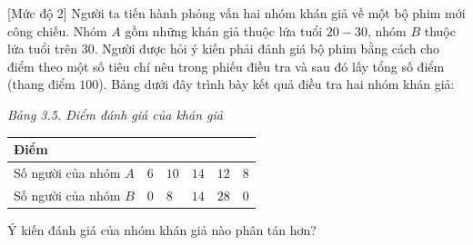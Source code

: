 \begin{bt}%
[Mức độ 2]
Người ta tiến hành phỏng vấn hai nhóm khán giả về một bộ phim mới công chiếu. Nhóm $A$ gồm những khán giả thuộc lứa tuổi $20-30$, nhóm $B$ thuộc lứa tuổi trên $30$. Người được hỏi ý kiến phải đánh giá bộ phim bằng cách cho điểm theo một số tiêu chí nêu trong phiếu điều tra và sau đó lấy tổng số điểm (thang điểm $100$). Bảng dưới đây trình bày kết quả điều tra hai nhóm khán giả:
\begin{center}
	{\it Bảng 3.5. Điểm đánh giá của khán giả}\\
	\begin{tabular}{|p{4cm}|p{2cm}|p{2cm}|p{2cm}|p{2cm}|p{2cm}|}
		\hline Điểm &\centering\arraybackslash {$[50; 60)$} &\centering\arraybackslash {$[60; 70)$} &\centering\arraybackslash {$[70; 80)$} &\centering\arraybackslash {$[80;90)$} &\centering\arraybackslash {$[90; 100)$} \\
		\hline Số người của nhóm $A$&\centering\arraybackslash $6$ &\centering\arraybackslash $10$&\centering\arraybackslash $14$ &\centering\arraybackslash $12$ &\centering\arraybackslash $8$ \\
		\hline Số người của nhóm $B$&\centering\arraybackslash $0$ &\centering\arraybackslash $8$ &\centering\arraybackslash $14$ &\centering\arraybackslash $28$ &\centering\arraybackslash $0$ \\
		\hline
	\end{tabular}
\end{center}
Ý kiến đánh giá của nhóm khán giả nào phân tán hơn?
\end{bt}

